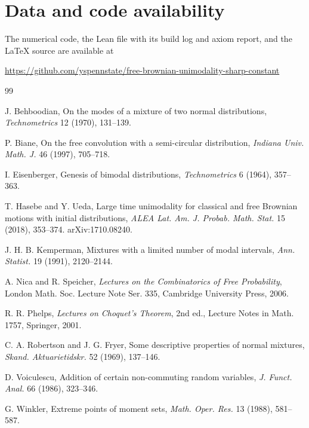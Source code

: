 \documentclass[11pt]{amsart}
\theoremstyle{definition}
\begin{document}
\section*{Data and code availability}
The numerical code, the Lean file with its build log and axiom report, and the \LaTeX{} source are available at
\begin{center}
\url{https://github.com/yspennstate/free-brownian-unimodality-sharp-constant}
\end{center}

\begin{thebibliography}{99}

 J. Behboodian, On the modes of a mixture of two normal distributions, \emph{Technometrics} 12 (1970), 131--139.

 P. Biane, On the free convolution with a semi-circular distribution, \emph{Indiana Univ. Math. J.} 46 (1997), 705--718.

 I. Eisenberger, Genesis of bimodal distributions, \emph{Technometrics} 6 (1964), 357--363.

 T. Hasebe and Y. Ueda, Large time unimodality for classical and free Brownian motions with initial distributions, \emph{ALEA Lat. Am. J. Probab. Math. Stat.} 15 (2018), 353--374. arXiv:1710.08240.

 J. H. B. Kemperman, Mixtures with a limited number of modal intervals, \emph{Ann. Statist.} 19 (1991), 2120--2144.

 A. Nica and R. Speicher, \emph{Lectures on the Combinatorics of Free Probability}, London Math. Soc. Lecture Note Ser. 335, Cambridge University Press, 2006.

 R. R. Phelps, \emph{Lectures on Choquet's Theorem}, 2nd ed., Lecture Notes in Math. 1757, Springer, 2001.

 C. A. Robertson and J. G. Fryer, Some descriptive properties of normal mixtures, \emph{Skand. Aktuarietidskr.} 52 (1969), 137--146.

 D. Voiculescu, Addition of certain non-commuting random variables, \emph{J. Funct. Anal.} 66 (1986), 323--346.

 G. Winkler, Extreme points of moment sets, \emph{Math. Oper. Res.} 13 (1988), 581--587.

\end{thebibliography}
\end{document}
